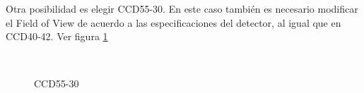 \documentclass[a4paper,10pt]{article}
\begin{document}
Otra posibilidad es elegir CCD55-30. En este caso también es necesario
modificar el Field of View de acuerdo a las especificaciones del detector, al igual que en CCD40-42.  Ver
figura \ref{fig:ccd50p2}
\begin{figure}[ht!]
  \centering
  ~ 
  ~ 
  \caption{CCD55-30}
  \label{fig:ccd50p2}
\end{figure}
\end{document}
